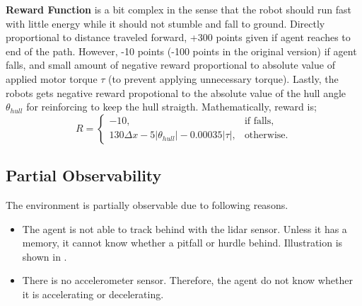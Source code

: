 \textbf{Reward Function} is a bit complex in the sense that the robot should run fast with little energy while it should not stumble and fall to ground. 
Directly proportional to distance traveled forward, +300 points given if agent reaches to end of the path. 
However, -10 points (-100 points in the original version) if agent falls, 
and small amount of negative reward proportional to absolute value of applied motor torque $\tau$ (to prevent applying unnecessary torque). 
Lastly, the robots gets negative reward propotional to the absolute value of the hull angle $\theta_{hull}$ for reinforcing to keep the hull straigth. 
Mathematically, reward is;
\begin{equation}
\label{eqn:reward_fcn}
R = 
\begin{cases}
-10,   & \text{if falls} ,\\
130 \Delta x -5 |\theta_{hull}| - 0.00035 |\tau|,   & \text{otherwise}.
\end{cases}
\end{equation}

\subsection{Partial Observability}

The environment is partially observable due to following reasons.
\begin{itemize}
	\item The agent is not able to track behind with the lidar sensor. 
	Unless it has a memory, it cannot know whether a pitfall or hurdle behind. 
	Illustration is shown in .
	\item There is no accelerometer sensor. 
	Therefore, the agent do not know whether it is accelerating or decelerating.
\end{itemize}

